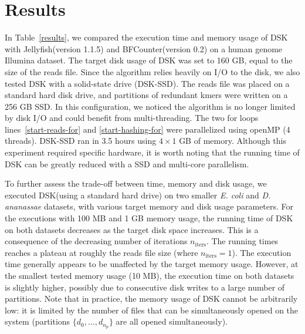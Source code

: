 \documentclass{bioinfo}
\newcommand{\dsk}{DSK\xspace}
\newcommand{\jelly}{Jellyfish\xspace}
\newcommand{\bfc}{BFCounter\xspace}
\begin{document}
\section{Results}

In Table~\ref{results}, we compared the execution time and memory usage of \dsk with \jelly (version 1.1.5) and \bfc (version 0.2) on a human genome Illumina dataset. The target disk usage of \dsk was set to 160 GB, equal to the size of the reads file.  
Since the algorithm relies heavily on I/O to the disk, we also tested \dsk with a solid-state drive (\dsk-SSD). The reads file was placed on a standard hard disk drive, and partitions of redundant kmers were written on a 256 GB SSD. In this configuration, we noticed the algorithm is no longer limited by disk I/O and could benefit from multi-threading. The two for loops lines~\ref{start-reads-for} and \ref{start-hashing-for} were parallelized using openMP (4 threads). \dsk-SSD ran in 3.5 hours using $4\times 1$ GB of memory. Although this experiment required specific hardware, it is worth noting that the running time of \dsk can be greatly reduced with a SSD and multi-core parallelism.

To further assess the trade-off between time, memory and disk usage, we executed \dsk (using a standard hard drive) on two smaller  \emph{E. coli} and \emph{D. ananassae} datasets, with various target memory and disk usage parameters. For the executions with 100 MB and 1 GB memory usage, the running time of \dsk on both datasets decreases as the target disk space increases. This is a consequence of the decreasing number of iterations $n_\textrm{iters}$. The running times reaches a plateau at roughly the reads file size (where $n_\textrm{iters} = 1$). The execution time generally appears to be unaffected by the target memory usage. However, at the smallest tested memory usage (10 MB), the execution time on both datasets is slightly higher, possibly due to consecutive disk writes to a large number of partitions.
Note that in practice, the memory usage of \dsk cannot be arbitrarily low: it is limited by the number of files that can be simultaneously opened on the system (partitions $\{d_0,...,d_{n_p}\}$ are all opened simultaneously).%
\end{document}
